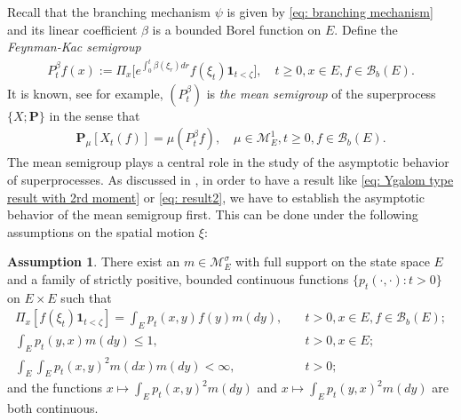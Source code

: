 \documentclass[12pt,a4paper]{amsart}
\theoremstyle{definition}
\newtheorem{asp}{Assumption}
\numberwithin{equation}{section}
\begin{document}
Recall that the branching mechanism $\psi$ is given by \eqref{eq: branching mechanism} and its linear coefficient $\beta$ is a bounded Borel function on $E$. Define the \emph{Feynman-Kac semigroup}
\begin{align}
  P^\beta_tf(x)
  := \Pi_x \big[e^{\int_0^{t} \beta(\xi_r)dr} f(\xi_t)\mathbf 1_{t<\zeta}\big],
  \quad t\geq 0, x\in E, f\in \mathscr B_b(E).
\end{align}
It is known, see \cite[Proposition 2.27]{Li2011Measure-valued} for example, $(P^\beta_t)$ is \emph{the mean semigroup} of the superprocess $\{X; \mathbf P\}$ in the sense that
\begin{align} 
\label{eq:mean_formula}
	\mathbf P_\mu [X_t(f)]
	= \mu(P^\beta_t f),
	\quad \mu \in \mathcal M^1_E,
	t \geq 0,f \in \mathscr B_b(E).
\end{align}
The mean semigroup plays a central role in the study of the asymptotic behavior of superprocesses.
As discussed in \cite{EvansPerkins1990Measure-valued}, in order to have a result like \eqref{eq: Ygalom type result with 2rd moment} or \eqref{eq: result2}, we have to establish the asymptotic behavior of the mean semigroup first.
This can be done under the following assumptions on the spatial motion $\xi$:
\begin{asp} \label{asp: 1}
  There exist an $m \in \mathcal M_E^\sigma$ with full support on the state space $E$ and a family of strictly positive,
	bounded continuous functions $\{ p_t(\cdot,\cdot): t > 0 \}$ on $E \times E$ such that
  \begin{align}
    \Pi_x[ f(\xi_t)\mathbf 1_{t < \zeta} ]
    = \int_E p_t(x,y) f(y) m(dy),
    &\quad t>0, x \in E,f \in \mathscr B_b(E);
    \\\int_E p_t(y,x)m(dy)
    \leq 1,	
    &\quad t>0,x\in E;
    \\\int_E \int_E p_t(x,y)^2 m(dx) m(dy)
    <\infty,
    &\quad t> 0;
  \end{align}
	and the functions $x \mapsto \int_E p_t(x,y)^2 m(dy)$ and $x \mapsto \int_E p_t(y,x)^2 m(dy)$ are both continuous.
\end{asp}
\end{document}
